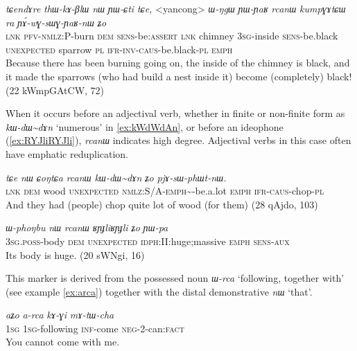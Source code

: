 \documentclass[oneside,a4paper,11pt]{article}
\newcommand{\ipa}[1]{\mbox{\phon\textit{#1}}} %
\begin{document}
\begin{exe}
\ex \label{ex:YAwGsWGYaRnW}
\gll 
\ipa{tɕendɤre} 	\ipa{thɯ-kɤ-βlɯ} 	\ipa{nɯ} 	\ipa{ɲɯ-ɕti} 	\ipa{tɕe,} 	<yancong>	 \ipa{ɯ-ŋgɯ} 	\ipa{ɲɯ-ɲaʁ} 	\ipa{rcanɯ} 	\ipa{kumpɣɤtɕɯ} 	\ipa{ra} 	\ipa{ɲɤ́-wɣ-sɯɣ-ɲaʁ-nɯ} 	\ipa{ʑo} 	\\
\textsc{lnk} \textsc{pfv-nmlz}:P-burn \textsc{dem} \textsc{sens}-be:\textsc{assert} \textsc{lnk} chimney \textsc{3sg}-inside \textsc{sens}-be.black \textsc{unexpected} sparrow \textsc{pl} \textsc{ifr-inv-caus}-be.black-\textsc{pl} \textsc{emph} \\
\glt Because there has been burning going on, the inside of the chimney is black, and it made the sparrows (who had build a nest inside it) become (completely) black! (22 kWmpGAtCW, 72)
\end{exe}
When it occurs before an adjectival verb, whether in finite or non-finite form as \ipa{kɯ-dɯ\textasciitilde{}dɤn} `numerous' in \ref{ex:kWdWdAn}, or before an ideophone (\ref{ex:RYJliRYJli}), \ipa{rcanɯ} indicates high degree. Adjectival verbs in this case often have emphatic reduplication.

\begin{exe}
\ex \label{ex:kWdWdAn}
\gll \ipa{tɕe} 	\ipa{nɯ} 	\ipa{ɕoŋtɕa} 	\ipa{rcanɯ} 	\ipa{kɯ-dɯ\textasciitilde{}dɤn} 	\ipa{ʑo} 	\ipa{pjɤ-sɯ-phɯt-nɯ.} \\
\textsc{lnk} \textsc{dem} wood \textsc{unexpected} \textsc{nmlz}:S/A-\textsc{emph}\textasciitilde{}-be.a.lot \textsc{emph} \textsc{ifr-caus}-chop-\textsc{pl}\\
\glt And they had (people) chop quite lot of wood (for them) (28 qAjdo,  103)
\end{exe}

\begin{exe}
\ex \label{ex:RYJliRYJli}
\gll
\ipa{ɯ-phoŋbu} 	\ipa{nɯ} 	\ipa{rcanɯ} 	\ipa{ʁɲɟliʁɲɟli} 	\ipa{ʑo} 	\ipa{ɲɯ-pa} \\
\textsc{3sg.poss}-body \textsc{dem}  \textsc{unexpected} \textsc{idph}:II:huge;massive \textsc{emph} \textsc{sens}-\textsc{aux} \\
\glt Its body is huge. (20 sWNgi,  16)
\end{exe}

This marker is derived from the possessed noun  \ipa{ɯ-rca} `following, together with' (see example \ref{ex:arca}) together with the distal demonstrative \ipa{nɯ} `that'.

\begin{exe}
\ex \label{ex:arca}
\gll
\ipa{aʑo} 	\ipa{a-rca} 	\ipa{kɤ-ɣi} 	\ipa{mɤ-tɯ-cha} \\
\textsc{1sg} \textsc{1sg}-following \textsc{inf}-come \textsc{neg}-2-can:\textsc{fact} \\
\glt You cannot come with me.
\end{exe}
 
\end{document}
